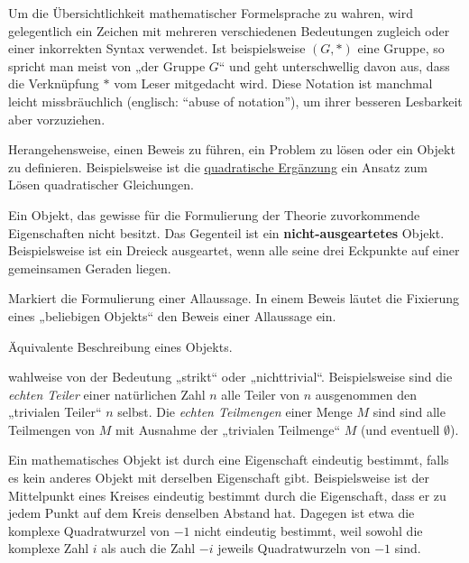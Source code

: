 \begin{description}[labelindent=0pt, leftmargin=0pt]

    \item[abuse of notation:] Um die Übersichtlichkeit mathematischer Formelsprache zu wahren, wird gelegentlich ein Zeichen mit mehreren verschiedenen Bedeutungen zugleich oder einer inkorrekten Syntax verwendet. Ist beispielsweise $(G,*)$ eine Gruppe, so spricht man meist von „der Gruppe $G$“ und geht unterschwellig davon aus, dass die Verknüpfung $*$ vom Leser mitgedacht wird. Diese Notation ist manchmal leicht missbräuchlich (englisch: ``abuse of notation''), um ihrer besseren Lesbarkeit aber vorzuziehen.

    \item[Ansatz:] Herangehensweise, einen Beweis zu führen, ein Problem zu lösen oder ein Objekt zu definieren. Beispielsweise ist die \href{https://en.wikipedia.org/wiki/Completing_the_square}{quadratische Ergänzung} ein Ansatz zum Lösen quadratischer Gleichungen. 
    
    \item[Ausgeartet:] Ein Objekt, das gewisse für die Formulierung der Theorie zuvorkommende Eigenschaften nicht besitzt. Das Gegenteil ist ein \textbf{nicht-ausgeartetes} Objekt. Beispielsweise ist ein Dreieck ausgeartet, wenn alle seine drei Eckpunkte auf einer gemeinsamen Geraden liegen.

    \item[Beliebig:] Markiert die Formulierung einer Allaussage. In einem Beweis läutet die Fixierung eines „beliebigen Objekts“ den Beweis einer Allaussage ein.

    \item[Charakterisierung:] Äquivalente Beschreibung eines Objekts.

    \item[Echt:] wahlweise von der Bedeutung „strikt“ oder „nichttrivial“. Beispielsweise sind die \emph{echten Teiler} einer natürlichen Zahl $n$ alle Teiler von $n$ ausgenommen den „trivialen Teiler“ $n$ selbst. Die \emph{echten Teilmengen} einer Menge $M$ sind sind alle Teilmengen von $M$ mit Ausnahme der „trivialen Teilmenge“ $M$ (und eventuell $\emptyset$).

    \item[Eindeutig bestimmt:] Ein mathematisches Objekt ist durch eine Eigenschaft eindeutig bestimmt, falls es kein anderes Objekt mit derselben Eigenschaft gibt. Beispielsweise ist der Mittelpunkt eines Kreises eindeutig bestimmt durch die Eigenschaft, dass er zu jedem Punkt auf dem Kreis denselben Abstand hat. Dagegen ist etwa die komplexe Quadratwurzel von $-1$ nicht eindeutig bestimmt, weil sowohl die komplexe Zahl $i$ als auch die Zahl $-i$ jeweils Quadratwurzeln von $-1$ sind.
    

\end{description}

